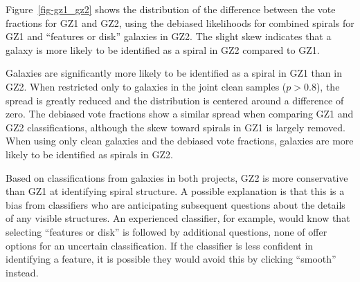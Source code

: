 \documentclass[useAMS,usenatbib]{mn2e}
\begin{document}
Figure~\ref{fig-gz1_gz2} shows the distribution of the difference between the vote fractions for GZ1 and GZ2, using the debiased likelihoods for combined spirals for GZ1 and ``features or disk'' galaxies in GZ2. The slight skew indicates that a galaxy is more likely to be identified as a spiral in GZ2 compared to GZ1. 

Galaxies are significantly more likely to be identified as a spiral in GZ1 than in GZ2. When restricted only to galaxies in the joint clean samples ($p>0.8$), the spread is greatly reduced and the distribution is centered around a difference of zero. The debiased vote fractions show a similar spread when comparing GZ1 and GZ2 classifications, although the skew toward spirals in GZ1 is largely removed. When using only clean galaxies and the debiased vote fractions, galaxies are more likely to be identified as spirals in GZ2. 

Based on classifications from galaxies in both projects, GZ2 is more conservative than GZ1 at identifying spiral structure. A possible explanation is that this is a bias from classifiers who are anticipating subsequent questions about the details of any visible structures. An experienced classifier, for example, would know that selecting ``features or disk'' is followed by additional questions, none of offer options for an uncertain classification. If the classifier is less confident in identifying a feature, it is possible they would avoid this by clicking ``smooth'' instead. %


\end{document}
